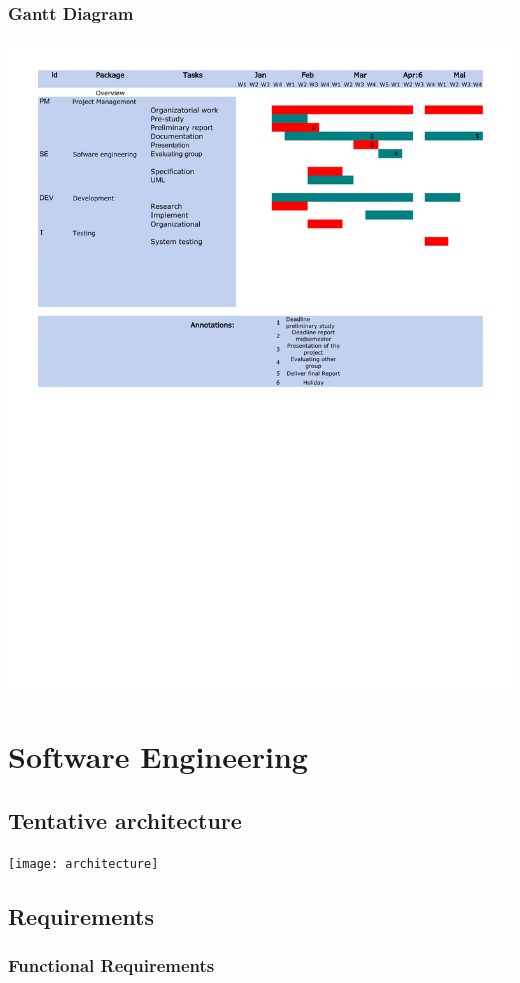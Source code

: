 \documentclass[12pt,a4paper,titlepage]{article}
\begin{document}
				\subsubsection{Gantt Diagram}
					\includegraphics[keepaspectratio=true,width=\linewidth]{gantt}
					
		\section{Software Engineering}
			\subsection{Tentative architecture}
				\texttt{[image: architecture]}
			\subsection{Requirements}
				\subsubsection{Functional Requirements}
\end{document}
